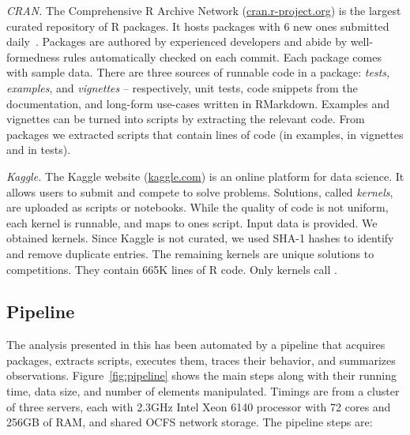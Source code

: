 \documentclass[review,screen,acmsmall]{acmart}
\newcommand{\mypara}[1]{\medskip\noindent\emph{#1}\xspace}
\begin{document}
\mypara{CRAN.} The Comprehensive R Archive Network
({\small \url{cran.r-project.org}}) is the largest curated repository of R
packages. It hosts \CranAvailablePackagesRnd packages with 6 new ones submitted
daily~\cite{Ligges2017}. Packages are authored by experienced developers and
abide by well-formedness rules automatically checked on each commit.
Each package comes with sample data. There are three sources of
runnable code in a package: \emph{tests, examples}, and \emph{vignettes} --
respectively, unit tests, code snippets from the documentation, and long-form
use-cases written in RMarkdown. Examples and vignettes can be turned into
scripts by extracting the relevant code. From \CranPackages packages we
extracted \CranRunnableScripts scripts that contain \CranRunnableCode lines of
code (\CranRunnableCodeExamplesRnd in examples, \CranRunnableCodeVignettesRnd in
vignettes and \CranRunnableCodeTestsRnd in tests).

\mypara{Kaggle.} The Kaggle website ({\small \url{kaggle.com}}) is an online
platform for data science. It allows users to submit and compete to solve
problems. Solutions, called \emph{kernels}, are uploaded as scripts or
notebooks. While the quality of code is not uniform, each kernel is runnable,
and maps to ones script. Input data is provided. We obtained \KaggleKernels
kernels. Since Kaggle is not curated, we used SHA-1 hashes to identify and
remove \KaggleDuplicates duplicate entries. The remaining \KaggleUnique kernels
are unique solutions to \KaggleCompetitions competitions. They contain
665K lines of R code. Only \KaggleWithEvals kernels call \eval.

\subsection{Pipeline}

The analysis presented in this has been automated by a pipeline that acquires
packages, extracts scripts, executes them, traces their behavior, and summarizes observations. Figure~\ref{fig:pipeline} shows the main steps along
 with their running time, data size, and  number of elements manipulated.
 Timings are from a cluster of three servers, each with 2.3GHz Intel Xeon 6140 processor with 72 cores and 256GB of RAM, and shared OCFS network storage. The pipeline steps are:
\end{document}
